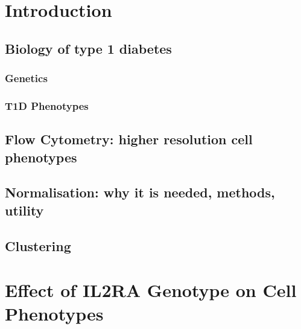 \documentclass[12pt,a4paper,table,twoside]{report}
\begin{document}
\clearpage


\tableofcontents
{}
%


\newpage
%

\chapter{Introduction}
\section{Biology of type 1 diabetes}
\subsection{Genetics}

\subsection{T1D Phenotypes}

\section{Flow Cytometry: higher resolution cell phenotypes}

\section{Normalisation: why it is needed, methods, utility}

\section{Clustering}


%

\chapter{ Effect of IL2RA Genotype on Cell Phenotypes }

\end{document}
